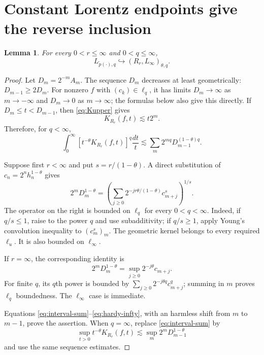 \documentclass[11pt]{article}
\newtheorem{lemma}[theorem]{Lemma}
\newcommand{\1}{\mathbf 1}
\begin{document}
\section{Constant Lorentz endpoints give the reverse inclusion}

\begin{lemma}\label{lem:strong}
For every $0<r\leq\infty$ and $0<q\leq\infty$,
\[
 L_{\widetilde p(\cdot),q}
 \hookrightarrow (R_r,L_\infty)_{\theta,q}.
\]
\end{lemma}

\begin{proof}
Let $D_m=2^{-m}A_m$. The sequence $D_m$ decreases at least geometrically:
$D_{m-1}\geq2D_m$. For nonzero $f$ with $(c_k)\in\ell_q$, it has limits
$D_m\to\infty$ as $m\to-\infty$ and $D_m\to0$ as $m\to\infty$; the formulas
below also give this directly.  If $D_m\leq t<D_{m-1}$, then
\eqref{eq:Kupper} gives
\[
 K_{R_r}(f,t)\lesssim t2^m.
\]
Therefore, for $q<\infty$,
\begin{equation}\label{eq:interval-sum}
 \int_0^\infty[t^{-\theta}K_{R_r}(f,t)]^q\frac{dt}{t}
 \lesssim \sum_m 2^{mq}D_{m-1}^{(1-\theta)q}.
\end{equation}

Suppose first $r<\infty$ and put $s=r/(1-\theta)$. A direct substitution
of $c_n=2^nh_n^{1-\theta}$ gives
\begin{equation}\label{eq:hardy-formula}
 2^mD_m^{1-\theta}
 =\left(\sum_{j\geq0}
 2^{-jr\theta/(1-\theta)}c_{m+j}^{s}\right)^{1/s}.
\end{equation}
The operator on the right is bounded on $\ell_q$ for every $0<q<\infty$.
Indeed, if $q/s\leq1$, raise to the power $q$ and use subadditivity; if
$q/s\geq1$, apply Young's convolution inequality to $(c_m^s)_m$.  The
geometric kernel belongs to every required $\ell_u$. It is also bounded on
$\ell_\infty$.

If $r=\infty$, the corresponding identity is
\begin{equation}\label{eq:hardy-infty}
 2^mD_m^{1-\theta}
 =\sup_{j\geq0}2^{-j\theta}c_{m+j}.
\end{equation}
For finite $q$, its $q$th power is bounded by
$\sum_{j\geq0}2^{-j\theta q}c_{m+j}^q$; summing in $m$ proves $\ell_q$
boundedness. The $\ell_\infty$ case is immediate.

Equations \eqref{eq:interval-sum}--\eqref{eq:hardy-infty}, with an harmless
shift from $m$ to $m-1$, prove the assertion. When $q=\infty$, replace
\eqref{eq:interval-sum} by
\[
 \sup_{t>0}t^{-\theta}K_{R_r}(f,t)
 \lesssim \sup_m2^mD_{m-1}^{1-\theta}
\]
and use the same sequence estimates.
\end{proof}
\end{document}
